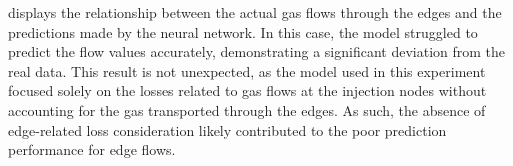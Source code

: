 
 displays the relationship between the actual gas flows through the edges and the predictions made by the neural network. In this case, the model struggled to predict the flow values accurately, demonstrating a significant deviation from the real data. This result is not unexpected, as the model used in this experiment focused solely on the losses related to gas flows at the injection nodes without accounting for the gas transported through the edges. As such, the absence of edge-related loss consideration likely contributed to the poor prediction performance for edge flows.


%
%

%

